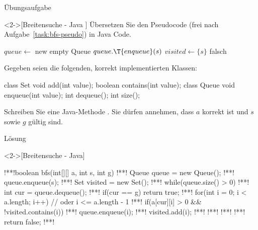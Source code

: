 \begin{frame}[fragile,c]{Übungsaufgabe}
    \begin{exercise}<2->[Breitensuche - Java ]
        \pause{}Übersetzen Sie den Pseudocode (frei nach Aufgabe~\ref{task:bfs-pseudo}) in Java Code.
\par\pause
{}%
%
%
%
%
\begin{minipage}{.5\linewidth}\scriptsize{}\SetAlgoVlined%
\begin{algorithm}[H]
\PreCode\StartCode
\(queue \leftarrow\) new empty Queue\;
\(queue.\T{enqueue}(s)\)\;
\(visited \leftarrow \{s\}\)\;
\KwRet falsch\;
\end{algorithm}\end{minipage}\hfill\begin{minipage}{.465\linewidth}%
    \pause{}Gegeben seien die folgenden, korrekt implementierten Klassen:\pause
\begin{plainjava}
class Set {
  void add(int value);
  boolean contains(int value);
}
class Queue {
  void enqueue(int value);
  int dequeue();
  int size();
}
\end{plainjava}
\end{minipage}\par
Schreiben Sie eine Java-Methode . Sie dürfen annehmen, dass \(a\) korrekt ist und \(s\) sowie \(g\) gültig sind.
    \end{exercise}
\end{frame}

\begin{frame}[fragile,c]{Lösung}
    \begin{solve}<2->[Breitensuche - Java]
\begin{plainjava}[morekeywords={[4]{enqueue,dequeue,contains,add,size}}]
!**!boolean bfs(int[][] a, int s, int g) {
!**!    Queue queue = new Queue();
!**!    queue.enqueue(s);
!**!    Set visited = new Set();
!**!    while(queue.size() > 0) {
!**!        int cur = queue.dequeue();
!**!        if(cur == g) return true;
!**!        for(int i = 0; i < a.length; i++) { // oder i <= a.length - 1
!**!            if(a[cur][i] > 0 && !visited.contains(i)) {
!**!                queue.enqueue(i);
!**!                visited.add(i);
!**!            }
!**!        }
!**!    }
!**!    return false;
!**!}
\end{plainjava}
    \end{solve}
\end{frame}
\fi
